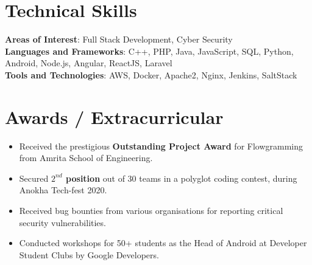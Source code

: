 \documentclass[letterpaper,11pt]{article}
\newcommand{\resumeItem}[1]{
  \item\small{
    {#1 \vspace{-2pt}}
  }
}
\newcommand{\resumeItemListStart}{\begin{itemize}}
\newcommand{\resumeItemListEnd}{\end{itemize}\vspace{-5pt}}
\begin{document}
%
\section{Technical Skills}
 \begin{itemize}[leftmargin=0.15in, label={}]
    \small{\item{
    \textbf{Areas of Interest}{: Full Stack Development, Cyber Security} \\
     \textbf{Languages and Frameworks}{: C++, PHP, Java, JavaScript, SQL, Python, Android, Node.js, Angular, ReactJS, Laravel} \\
     \textbf{Tools and Technologies}{: AWS, Docker, Apache2, Nginx, Jenkins, SaltStack} \\
    }}
 \end{itemize}
 \vspace{-16pt}


\section{Awards / Extracurricular}
            \resumeItemListStart
            	\resumeItem{Received the prestigious \textbf{Outstanding Project Award} for Flowgramming from Amrita School of Engineering.}\vspace{-5pt}
                \resumeItem{Secured \textbf{{$2^{nd}$} position} out of 30 teams in a polyglot coding contest, during Anokha Tech-fest 2020.}\vspace{-5pt}
                \resumeItem{Received bug bounties from various organisations for reporting critical security vulnerabilities.}\vspace{-5pt}
                \resumeItem{Conducted workshops for 50+ students as the Head of Android at Developer Student Clubs by Google Developers.}\vspace{-5pt}
            \resumeItemListEnd
\end{document}
